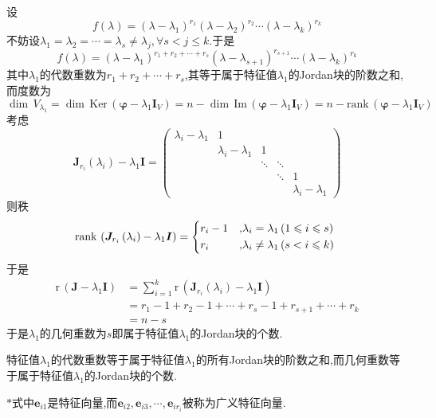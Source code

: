     设\[
    f\left(\lambda\right)=\left(\lambda-\lambda_1\right)^{r_1}\left(\lambda-\lambda_2\right)^{r_2}\cdots\left(\lambda-\lambda_k\right)^{r_k}
    \]不妨设$\lambda_1=\lambda_2=\cdots=\lambda_s\neq \lambda_j,\forall s<j\leqslant k.$于是\[
    f\left(\lambda\right)=\left(\lambda-\lambda_1\right)^{r_1+r_2+\cdots+r_s}\left(\lambda-\lambda_{s+1}\right)^{r_{s+1}}\cdots\left(\lambda-\lambda_k\right)^{r_k}
    \]其中$\lambda_1$的代数重数为$r_1+r_2+\cdots+r_s$,其等于属于特征值$\lambda_1$的Jordan块的阶数之和,而度数为\[
    \dim\,V_{\lambda_1}=\dim\,\mathrm{Ker}\,\left(
        \bm{\varphi}-\lambda_1\bm{I}_V
    \right)=n-\dim\,\mathrm{Im}\,\left(
        \bm{\varphi}-\lambda_1\bm{I}_V
    \right)=n-\mathrm{rank}\,\left(
        \bm{\varphi}-\lambda_1\bm{I}_V
    \right)
    \]考虑\[\bm{J}_{r_i}\left(\lambda_i\right)-\lambda_1\bm{I}=
    \begin{pmatrix}
        \lambda_i-\lambda_1&1&&&\\
        &\lambda_i-\lambda_1&1&\\
        &&\ddots&\ddots&\\
        &&&\ddots&1\\
        &&&&\lambda_i-\lambda_1
    \end{pmatrix}
    \]则秩\[
    \mathrm{rank}\,\left(
        \bm{J}_{r_i}\left(\lambda_i\right)-\lambda_1\bm{I}
    \right)=\begin{cases*}
    r_i-1&,$\lambda_i=\lambda_1\left(1\leqslant i\leqslant s\right)$\\
    r_i&,$\lambda_i\neq \lambda_1\left(s<i\leqslant k\right)$
    \end{cases*}
    \]于是\begin{align*}
    \mathrm{r}\,\left(\bm{J}-\lambda_1\bm{I}\right)&=\sum_{i=1}^k\mathrm{r}\,\left(
        \bm{J}_{r_i}\left(\lambda_i\right)-\lambda_1\bm{I}
    \right)\\
    &=r_1-1+r_2-1+\cdots+r_s-1+r_{s+1}+\cdots+r_k\\
    &=n-s
    \end{align*}
    于是$\lambda_1$的几何重数为$s$即属于特征值$\lambda_1$的Jordan块的个数.
\begin{formal}
\begin{theorem}[代数重数与几何重数]\label{thm:代数重数与几何重数}
    特征值$\lambda_1$的代数重数等于属于特征值$\lambda_1$的所有\textup{Jordan}块的阶数之和,而几何重数等于属于特征值$\lambda_1$的\textup{Jordan}块的个数.
\end{theorem}
\end{formal}
\begin{red}
\begin{remark}
    $*$式中$\bm{e}_{i1}$是特征向量,而$\bm{e}_{i2},\bm{e}_{i3},\cdots,\bm{e}_{ir_i}$被称为广义特征向量.
\end{remark}
\end{red}
